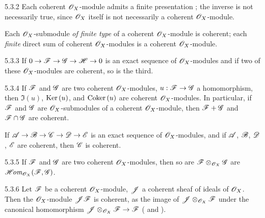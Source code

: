 \begin{env}{5.3.2}
\label{env-0.5.3.2}
Each coherent $\mathscr{O}_X$-module admits a finite presentation ; the inverse is
not necessarily true, since $\mathscr{O}_X$ itself is not necessarily a coherent $\mathscr{O}_X$-module.

Each $\mathscr{O}_X$-submodule \emph{of finite type} of a coherent $\mathscr{O}_X$-module is coherent; each
\emph{finite} direct sum of coherent $\mathscr{O}_X$-modules is a coherent $\mathscr{O}_X$-module.
\end{env}

\begin{env}{5.3.3}
\label{env-0.5.3.3}
If $0\to\mathscr{F}\to\mathscr{G}\to\mathscr{H}\to 0$ is an exact sequence  of $\mathscr{O}_X$-modules and if two of
these $\mathscr{O}_X$-modules are coherent, so is the third.
\end{env}

\begin{env}{5.3.4}
\label{env-0.5.3.4}
If $\mathscr{F}$ and $\mathscr{G}$ are two coherent $\mathscr{O}_X$-modules, $u:\mathscr{F}\to\mathscr{G}$ a
homomorphism, then $\Im(u)$, ${\mathop{\mathrm{Ker}}\nolimits}\,(u)$, and ${\mathop{\mathrm{Coker}}\nolimits}\,(u)$ are coherent $\mathscr{O}_X$-modules. In
particular, if $\mathscr{F}$ and $\mathscr{G}$ are $\mathscr{O}_X$-submodules of a coherent $\mathscr{O}_X$-module,
then $\mathscr{F}+\mathscr{G}$ and $\mathscr{F}\cap\mathscr{G}$ are coherent.

If $\mathscr{A}\to\mathscr{B}\to\mathscr{C}\to\mathscr{D}\to\mathscr{E}$ is an exact sequence of $\mathscr{O}_X$-modules, and
if $\mathscr{A}$, $\mathscr{B}$, $\mathscr{D}$, $\mathscr{E}$ are coherent, then $\mathscr{C}$ is coherent.
\end{env}

\begin{env}{5.3.5}
\label{env-0.5.3.5}
If $\mathscr{F}$ and $\mathscr{G}$ are two coherent $\mathscr{O}_X$-modules, then so are
$\mathscr{F}\otimes_{\mathscr{O}_X}\mathscr{G}$ are $\mathscr{H}\!\textit{om}_{\mathscr{O}_X}(\mathscr{F},\mathscr{G})$.
\end{env}

\begin{env}{5.3.6}
\label{env-0.5.3.6}
Let $\mathscr{F}$ be a coherent $\mathscr{O}_X$-module, $\mathscr{J}$ a coherent sheaf of ideals of $\mathscr{O}_X$.
Then the $\mathscr{O}_X$-module $\mathscr{J}\mathscr{F}$ is coherent, as the image of
$\mathscr{J}\otimes_{\mathscr{O}_X}\mathscr{F}$ under the canonical homomorphism
$\mathscr{J}\otimes_{\mathscr{O}_X}\mathscr{F}\to\mathscr{F}$ ( and ).
\end{env}

